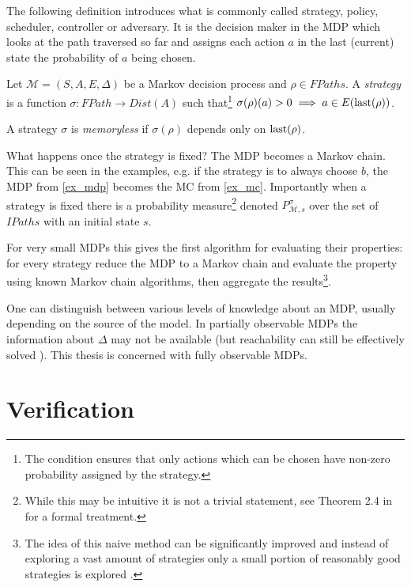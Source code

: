 The following definition introduces what is commonly called strategy,
policy, scheduler, controller or adversary. It is the decision maker in
the MDP which looks at the path traversed so far and assigns each action
$a$ in the last (current) state the probability of $a$ being chosen.

\begin{definition}[Strategy]
    Let $\mathcal{M} = (S,A,E,\Delta)$ be a Markov decision process
    and $\rho \in FPaths$.
    A {\em strategy} is a function
    $\sigma : FPath \to Dist(A)$
    such that\footnote{
The condition ensures that only actions which can
be chosen have non-zero probability assigned by the strategy.
    }
    $\sigma(\rho)(a) > 0 \implies a \in E(\operatorname{last}(\rho))$.

    A strategy $\sigma$ is {\em memoryless} if $\sigma(\rho)$ depends
    only on $\operatorname{last}(\rho)$.
\end{definition}

What happens once the strategy is fixed? The MDP becomes a Markov chain.
This can be seen in the examples, e.g. if the strategy is to always
choose $b$, the MDP from \autoref{ex_mdp} becomes the MC from
\autoref{ex_mc}.
Importantly when a strategy is fixed there is a probability
measure\footnote{While this may be intuitive it is not a trivial
statement, see Theorem 2.4 in \parencite{denumerable_mc} for a formal
treatment.} denoted $P^\sigma_{\mathcal{M},s}$ over the set of
$IPaths$ with an initial state $s$.

For very small MDPs this gives the first algorithm for evaluating
their properties: for every strategy reduce the MDP to a Markov chain
and evaluate the property using known Markov chain algorithms, then
aggregate the results\footnote{The idea of this naive method can be
significantly improved and instead of exploring a vast amount of
strategies only a small portion of reasonably good strategies is
explored \parencite{smc}.}.

One can distinguish between various levels of knowledge about an MDP,
usually depending on the source of the model.  In partially observable
MDPs the information about $\Delta$ may not be available (but
reachability can still be effectively solved \parencite{atva14}). This
thesis is concerned with fully observable MDPs.


\section{Verification}

